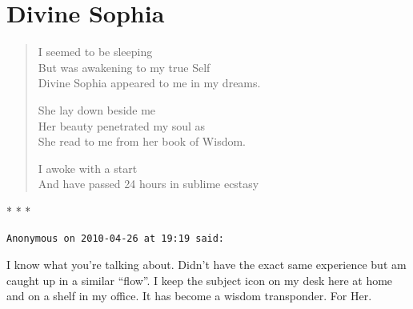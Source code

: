 \section{Divine Sophia}

\begin{verse}
I seemed to be sleeping\\ But was awakening to my true Self\\ Divine Sophia appeared to me in my dreams.

She lay down beside me\\ Her beauty penetrated my soul as\\ She read to me from her book of Wisdom.

I awoke with a start\\ And have passed 24 hours in sublime ecstasy
\end{verse}


\begin{center}* * *\end{center}

\begin{footnotesize}
\begin{sffamily}
\texttt{Anonymous on 2010-04-26 at 19:19 said:}

I know what you're talking about. Didn't have the exact same experience but am caught up in a similar ``flow''. I keep the subject icon on my desk here at home and on a shelf in my office. It has become a wisdom transponder. For Her.

\end{sffamily}
\end{footnotesize}


